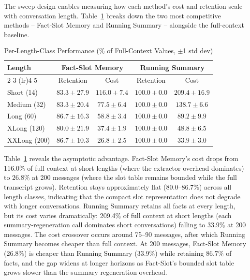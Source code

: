 \documentclass[conference]{IEEEtran}
\begin{document}
The sweep design enables measuring how each method's cost and retention scale with conversation length. Table~\ref{tab:by-length} breaks down the two most competitive methods -- Fact-Slot Memory and Running Summary -- alongside the full-context baseline.

\begin{table}[h]
\centering
\caption{Per-Length-Class Performance (\% of Full-Context Values, $\pm$1 std dev)}
\label{tab:by-length}
\small
\setlength{\tabcolsep}{3pt}
\begin{tabular}{lcccc}
\toprule
\textbf{Length} & \multicolumn{2}{c}{\textbf{Fact-Slot Memory}} & \multicolumn{2}{c}{\textbf{Running Summary}} \\
\cmidrule(lr){2-3} \cmidrule(lr){4-5}
 & Retention & Cost & Retention & Cost \\
\midrule
Short (14) & $83.3\pm27.9$ & $116.0\pm7.4$ & $100.0\pm0.0$ & $209.4\pm16.9$ \\
Medium (32) & $83.3\pm20.4$ & $77.5\pm6.4$ & $100.0\pm0.0$ & $138.7\pm6.6$ \\
Long (60) & $86.7\pm16.3$ & $58.8\pm3.4$ & $100.0\pm0.0$ & $89.2\pm9.9$ \\
XLong (120) & $80.0\pm21.9$ & $37.4\pm1.9$ & $100.0\pm0.0$ & $48.8\pm6.5$ \\
XXLong (200) & $86.7\pm10.3$ & $26.8\pm2.5$ & $100.0\pm0.0$ & $33.9\pm3.0$ \\
\bottomrule
\end{tabular}
\end{table}

Table~\ref{tab:by-length} reveals the asymptotic advantage. Fact-Slot Memory's cost drops from 116.0\% of full context at short lengths (where the extractor overhead dominates) to 26.8\% at 200 messages (where the slot table remains bounded while the full transcript grows). Retention stays approximately flat (80.0--86.7\%) across all length classes, indicating that the compact slot representation does not degrade with longer conversations. Running Summary retains all facts at every length, but its cost varies dramatically: 209.4\% of full context at short lengths (each summary-regeneration call dominates short conversations) falling to 33.9\% at 200 messages. The cost crossover occurs around 75--90 messages, after which Running Summary becomes cheaper than full context. At 200 messages, Fact-Slot Memory (26.8\%) is cheaper than Running Summary (33.9\%) while retaining 86.7\% of facts, and the gap widens at longer horizons as Fact-Slot's bounded slot table grows slower than the summary-regeneration overhead.
\end{document}
